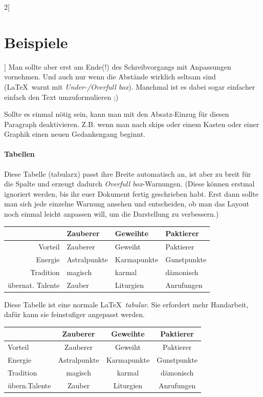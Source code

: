 \documentclass[linksbund]{rpg-ilaris}
\begin{document}
\begin{multicols}{2}[        %
		\chapter{Beispiele}  %
		]
Man sollte aber erst am Ende(!) des Schreibvorgangs mit  Anpassungen vornehmen. Und auch nur wenn die Abstände wirklich seltsam sind (\LaTeX\ warnt mit \emph{Under-/Overfull box}). Manchmal ist es dabei sogar einfacher einfach den Text umzuformulieren ;)

Sollte es einmal nötig sein, kann man mit  den Absatz-Einzug für diesen Paragraph deaktivieren. Z.B. wenn man nach skips oder einem Kasten oder einer Graphik einen neuen Gedankengang beginnt.


\subsubsection{Tabellen}
Diese Tabelle (tabularx) passt ihre Breite automatisch an, ist aber zu breit für die Spalte und erzeugt dadurch \emph{Overfull box}-Warnungen. (Diese können erstmal ignoriert werden, bis ihr euer Dokument fertig geschrieben habt. Erst dann sollte man sich jede einzelne Warnung ansehen und entscheiden, ob man das Layout noch einmal leicht anpassen will, um die Darstellung zu verbessern.)

\begin{tabularx}{\linewidth}{rXXX}
			  & \textbf{Zauberer} & \textbf{Geweihte} & \textbf{Paktierer} \\
	\hline
	Vorteil	  & Zauberer	 & Geweiht	   & Paktierer \\   
	Energie	  & Astralpunkte & Karmapunkte & Gunstpunkte \\ 
	Tradition & magisch	     & karmal	   & dämonisch \\   
übernat. Talente & Zauber	 & Liturgien   & Anrufungen \\  
\end{tabularx}

\bigskip

Diese Tabelle ist eine normale \LaTeX\ \emph{tabular}. Sie erfordert mehr Handarbeit, dafür kann sie feinstufiger angepasst werden.


\begin{tabular}{l@{ }c@{\ }c@{\ }c}
			  & \textbf{Zauberer} & \textbf{Geweihte} & \textbf{Paktierer} \\
	\hline
	Vorteil	  & Zauberer	 & Geweiht	   & Paktierer \\
	Energie	  & Astralpunkte & Karmapunkte & Gunstpunkte \\
	Tradition & magisch	     & karmal	   & dämonisch \\
übern.Talente & Zauber	     & Liturgien   & Anrufungen \\
\end{tabular}
\end{multicols}
\end{document}
